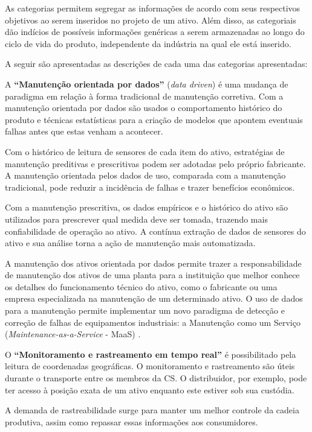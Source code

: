 As categorias permitem segregar as informações de acordo com seus respectivos objetivos ao serem inseridos no projeto de um ativo. Além disso, as categoriais dão indícios de possíveis informações genéricas a serem armazenadas ao longo do ciclo de vida do produto, independente da indústria na qual ele está inserido.

A seguir são apresentadas as descrições de cada uma das categorias apresentadas:

A \textbf{``Manutenção orientada por dados''} (\textit{data driven}) é uma mudança de paradigma em relação à forma tradicional de manutenção corretiva. Com a manutenção orientada por dados são usados o comportamento histórico do produto e técnicas estatísticas para a criação de modelos que apontem eventuais falhas antes que estas venham a acontecer.

Com o histórico de leitura de sensores de cada item do ativo, estratégias de manutenção preditivas e prescritivas podem ser adotadas pelo próprio fabricante. A manutenção orientada pelos dados de uso, comparada com a manutenção tradicional, pode reduzir a incidência de falhas e trazer benefícios econômicos.

Com a manutenção prescritiva, os dados empíricos e o histórico do ativo são utilizados para prescrever qual medida deve ser tomada, trazendo mais confiabilidade de operação ao ativo. A contínua extração de dados de sensores do ativo e sua análise torna a ação de manutenção mais automatizada.

A manutenção dos ativos orientada por dados permite trazer a responsabilidade de manutenção dos ativos de uma planta para a instituição que melhor conhece os detalhes do funcionamento técnico do ativo, como o fabricante ou uma empresa especializada na manutenção de um determinado ativo. O uso de dados para a manutenção permite implementar um novo paradigma de detecção e correção de falhas de equipamentos industriais: a Manutenção como um Serviço (\textit{Maintenance-as-a-Service} - MaaS) \cite{zoll2018maas}.

O \textbf{``Monitoramento e rastreamento em tempo real''} é possibilitado pela leitura de coordenadas geográficas. O monitoramento e rastreamento são úteis durante o transporte entre os membros da CS. O distribuidor, por exemplo, pode ter acesso à posição exata de um ativo enquanto este estiver sob sua custódia.

A demanda de rastreabilidade surge para manter um melhor controle da cadeia produtiva, assim como repassar essas informações aos consumidores.

